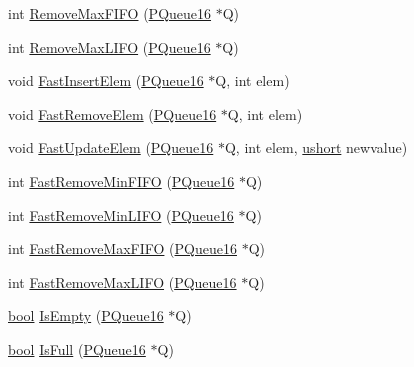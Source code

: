 \begin{DoxyCompactItemize}
\item 
int \hyperlink{namespacegft_1_1PQueue16_ac660562e12c719fbe346f9958405490b}{Remove\-Max\-F\-I\-F\-O} (\hyperlink{namespacegft_1_1PQueue16_afab9efb91a79a40b6b74c53c0c19da3d}{P\-Queue16} $\ast$Q)
\item 
int \hyperlink{namespacegft_1_1PQueue16_a3a208e688f51a8cbfabdf55c0204727f}{Remove\-Max\-L\-I\-F\-O} (\hyperlink{namespacegft_1_1PQueue16_afab9efb91a79a40b6b74c53c0c19da3d}{P\-Queue16} $\ast$Q)
\item 
void \hyperlink{namespacegft_1_1PQueue16_a2fc6593ccd5a3b727aec43e59e1ece0f}{Fast\-Insert\-Elem} (\hyperlink{namespacegft_1_1PQueue16_afab9efb91a79a40b6b74c53c0c19da3d}{P\-Queue16} $\ast$Q, int elem)
\item 
void \hyperlink{namespacegft_1_1PQueue16_ad8d4caea9e345f3b6abe8b67b390ff82}{Fast\-Remove\-Elem} (\hyperlink{namespacegft_1_1PQueue16_afab9efb91a79a40b6b74c53c0c19da3d}{P\-Queue16} $\ast$Q, int elem)
\item 
void \hyperlink{namespacegft_1_1PQueue16_a2f2daca9969086a069adc819f8182758}{Fast\-Update\-Elem} (\hyperlink{namespacegft_1_1PQueue16_afab9efb91a79a40b6b74c53c0c19da3d}{P\-Queue16} $\ast$Q, int elem, \hyperlink{namespacegft_a878518cf75338c097e2c8e9b10bfb00d}{ushort} newvalue)
\item 
int \hyperlink{namespacegft_1_1PQueue16_aff6da227a3288d230c1dd9fb5593632d}{Fast\-Remove\-Min\-F\-I\-F\-O} (\hyperlink{namespacegft_1_1PQueue16_afab9efb91a79a40b6b74c53c0c19da3d}{P\-Queue16} $\ast$Q)
\item 
int \hyperlink{namespacegft_1_1PQueue16_a614a4363de70bb1822be458652175af6}{Fast\-Remove\-Min\-L\-I\-F\-O} (\hyperlink{namespacegft_1_1PQueue16_afab9efb91a79a40b6b74c53c0c19da3d}{P\-Queue16} $\ast$Q)
\item 
int \hyperlink{namespacegft_1_1PQueue16_ac196d8dc71ca0557ec4c1e52e7aa2bdd}{Fast\-Remove\-Max\-F\-I\-F\-O} (\hyperlink{namespacegft_1_1PQueue16_afab9efb91a79a40b6b74c53c0c19da3d}{P\-Queue16} $\ast$Q)
\item 
int \hyperlink{namespacegft_1_1PQueue16_a45bd7c11b4e0ee9da50baf439a5cc366}{Fast\-Remove\-Max\-L\-I\-F\-O} (\hyperlink{namespacegft_1_1PQueue16_afab9efb91a79a40b6b74c53c0c19da3d}{P\-Queue16} $\ast$Q)
\item 
\hyperlink{namespacegft_a033dba4822661600b08d2bbf16879252}{bool} \hyperlink{namespacegft_1_1PQueue16_a33773d2b4cb0647b43282bafa6d4379b}{Is\-Empty} (\hyperlink{namespacegft_1_1PQueue16_afab9efb91a79a40b6b74c53c0c19da3d}{P\-Queue16} $\ast$Q)
\item 
\hyperlink{namespacegft_a033dba4822661600b08d2bbf16879252}{bool} \hyperlink{namespacegft_1_1PQueue16_ad5649be20360c6fef29c6581be6f7271}{Is\-Full} (\hyperlink{namespacegft_1_1PQueue16_afab9efb91a79a40b6b74c53c0c19da3d}{P\-Queue16} $\ast$Q)
\end{DoxyCompactItemize}


